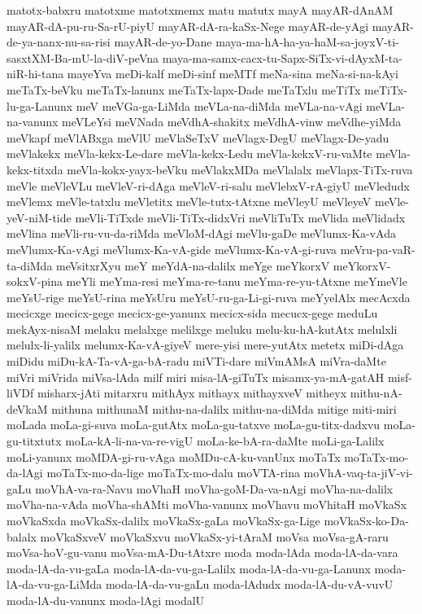 {matotx-babxru
matotxme
matotxmemx
matu
matutx
mayA
mayAR-dAnAM
mayAR-dA-pu-ru-Sa-rU-piyU
mayAR-dA-ra-kaSx-Nege
mayAR-de-yAgi
mayAR-de-ya-nanx-nu-sa-risi
mayAR-de-yo-Dane
maya-ma-hA-ha-ya-haM-sa-joyxV-ti-sasxtXM-Ba-mU-la-diV-peVna
maya-ma-samx-cacx-tu-Sapx-SiTx-vi-dAyxM-ta-niR-hi-tana
mayeYva
meDi-kalf
meDi-sinf
meMTf
meNa-sina
meNa-si-na-kAyi
meTaTx-beVku
meTaTx-lanunx
meTaTx-lapx-Dade
meTaTxlu
meTiTx
meTiTx-lu-ga-Lanunx
meV
meVGa-ga-LiMda
meVLa-na-diMda
meVLa-na-vAgi
meVLa-na-vanunx
meVLeYsi
meVNada
meVdhA-shakitx
meVdhA-vinw
meVdhe-yiMda
meVkapf
meVlABxga
meVlU
meVlaSeTxV
meVlagx-DegU
meVlagx-De-yadu
meVlakekx
meVla-kekx-Le-dare
meVla-kekx-Ledu
meVla-kekxV-ru-vaMte
meVla-kekx-titxda
meVla-kokx-yayx-beVku
meVlakxMDa
meVlalalx
meVlapx-TiTx-ruva
meVle
meVleVLu
meVleV-ri-dAga
meVleV-ri-salu
meVlebxV-rA-giyU
meVledudx
meVlemx
meVle-tatxlu
meVletitx
meVle-tutx-tAtxne
meVleyU
meVleyeV
meVle-yeV-niM-tide
meVli-TiTxde
meVli-TiTx-didxVri
meVliTuTx
meVlida
meVlidadx
meVlina
meVli-ru-vu-da-riMda
meVloM-dAgi
meVlu-gaDe
meVlumx-Ka-vAda
meVlumx-Ka-vAgi
meVlumx-Ka-vA-gide
meVlumx-Ka-vA-gi-ruva
meVru-pa-vaR-ta-diMda
meVsitxrXyu
meY
meYdA-na-dalilx
meYge
meYkorxV
meYkorxV-sokxV-pina
meYli
meYma-resi
meYma-re-tanu
meYma-re-yu-tAtxne
meYmeVle
meYsU-rige
meYsU-rina
meYsUru
meYsU-ru-ga-Li-gi-ruva
meYyelAlx
mecAcxda
mecicxge
mecicx-gege
mecicx-ge-yanunx
mecicx-sida
mecucx-gege
meduLu
mekAyx-nisaM
melaku
melalxge
melilxge
meluku
melu-ku-hA-kutAtx
melulxli
melulx-li-yalilx
melumx-Ka-vA-giyeV
mere-yisi
mere-yutAtx
metetx
miDi-dAga
miDidu
miDu-kA-Ta-vA-ga-bA-radu
miVTi-dare
miVmAMsA
miVra-daMte
miVri
miVrida
miVsa-lAda
milf
miri
misa-lA-giTuTx
misamx-ya-mA-gatAH
misf-liVDf
misharx-jAti
mitarxru
mithAyx
mithayx
mithayxveV
mitheyx
mithu-nA-deVkaM
mithuna
mithunaM
mithu-na-dalilx
mithu-na-diMda
mitige
miti-miri
moLada
moLa-gi-suva
moLa-gutAtx
moLa-gu-tatxve
moLa-gu-titx-dadxvu
moLa-gu-titxtutx
moLa-kA-li-na-va-re-vigU
moLa-ke-bA-ra-daMte
moLi-ga-Lalilx
moLi-yanunx
moMDA-gi-ru-vAga
moMDu-cA-ku-vanUnx
moTaTx
moTaTx-mo-da-lAgi
moTaTx-mo-da-lige
moTaTx-mo-dalu
moVTA-rina
moVhA-vaq-ta-jiV-vi-gaLu
moVhA-va-ra-Navu
moVhaH
moVha-goM-Da-va-nAgi
moVha-na-dalilx
moVha-na-vAda
moVha-shAMti
moVha-vanunx
moVhavu
moVhitaH
moVkaSx
moVkaSxda
moVkaSx-dalilx
moVkaSx-gaLa
moVkaSx-ga-Lige
moVkaSx-ko-Da-balalx
moVkaSxveV
moVkaSxvu
moVkaSx-yi-tAraM
moVsa
moVsa-gA-raru
moVsa-hoV-gu-vanu
moVsa-mA-Du-tAtxre
moda
moda-lAda
moda-lA-da-vara
moda-lA-da-vu-gaLa
moda-lA-da-vu-ga-Lalilx
moda-lA-da-vu-ga-Lanunx
moda-lA-da-vu-ga-LiMda
moda-lA-da-vu-gaLu
moda-lAdudx
moda-lA-du-vA-vuvU
moda-lA-du-vanunx
moda-lAgi
modalU
}
